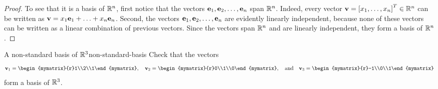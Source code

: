 \begin{proof}
  To see that it is a basis of $\mathbb{R}^n$, first notice that the vectors
  $\mbox{\bf e}_1,\mbox{\bf e}_2,\ldots,\mbox{\bf e}_n$ span $\mathbb{R}^n$. Indeed, every
  vector $\mbox{\bf v} = \left[x_1,\ldots,x_n\right]^T\in\mathbb{R}^n$ can be written as
  $\mbox{\bf v} = x_1\mbox{\bf e}_1+\ldots+x_n\mbox{\bf e}_n$. Second, the vectors
  $\mbox{\bf e}_1,\mbox{\bf e}_2,\ldots,\mbox{\bf e}_n$ are evidently linearly
  independent, because none of these vectors can be written as a
  linear combination of previous vectors. Since the vectors span
  $\mathbb{R}^n$ and are linearly independent, they form a basis of $\mathbb{R}^n$.
\end{proof}

\begin{example}{A non-standard basis of $\mathbb{R}^3$}{non-standard-basis}
  Check that the vectors
  \begin{equation*}
    \vect{v}_1 = \begin{mymatrix}{r}1\\2\\1\end{mymatrix},\quad
    \vect{v}_2 = \begin{mymatrix}{r}0\\1\\0\end{mymatrix},\quad
    \mbox{and}\quad
    \vect{v}_3 = \begin{mymatrix}{r}-1\\0\\1\end{mymatrix}
  \end{equation*}
  form a basis of $\mathbb{R}^3$.
\end{example}

